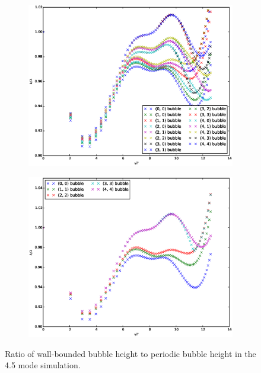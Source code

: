\begin{figure}
\begin{subfigure}[b]{0.5\textwidth}
  \includegraphics[width=\textwidth]{plts/walls_h}
\end{subfigure}
\begin{subfigure}[b]{0.5\textwidth}
  \includegraphics[width=\textwidth]{plts/walls_h_diag}
\end{subfigure}
\caption{ 
Ratio of wall-bounded bubble height to periodic bubble height in the 4.5 mode simulation.
}
\end{figure}

